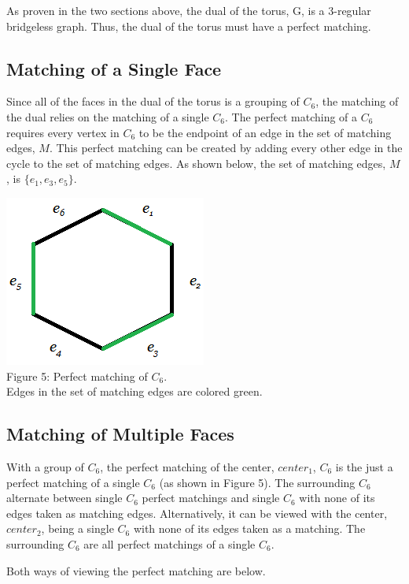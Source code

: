 \documentclass[12pt]{article}
\begin{document}
\begin{flushleft}
\medskip
As proven in the two sections above, the dual of the torus, G, is a 3-regular bridgeless graph. Thus, the dual of the torus must have a perfect matching.

\subsection*{Matching of a Single Face}
\medskip
Since all of the faces in the dual of the torus is a grouping of $C_6$, the matching of the dual relies on the matching of a single $C_6$. The perfect matching of a $C_6$ requires every vertex in $C_6$ to be the endpoint of an edge in the set of matching edges, $M$. This perfect matching can be created by adding every other edge in the cycle to the set of matching edges. As shown below, the set of matching edges, $M$, is $\{e_1, e_3, e_5\}$.

\begin{center}
\includegraphics[scale=1]{images/c6matching.png}\\
Figure 5: Perfect matching of $C_6$.\\
Edges in the set of matching edges are colored green.
\end{center}

\subsection*{Matching of Multiple Faces}
\medskip
With a group of $C_6$, the perfect matching of the center, $center_1$, $C_6$ is the just a perfect matching of a single $C_6$ (as shown in Figure 5). The surrounding $C_6$ alternate between single $C_6$ perfect matchings and single $C_6$ with none of its edges taken as matching edges. Alternatively, it can be viewed with the center, $center_2$, being a single $C_6$ with none of its edges taken as a matching. The surrounding $C_6$ are all perfect matchings of a single $C_6$.

\newpage
\medskip
Both ways of viewing the perfect matching are below.


\end{flushleft}
\end{document}
